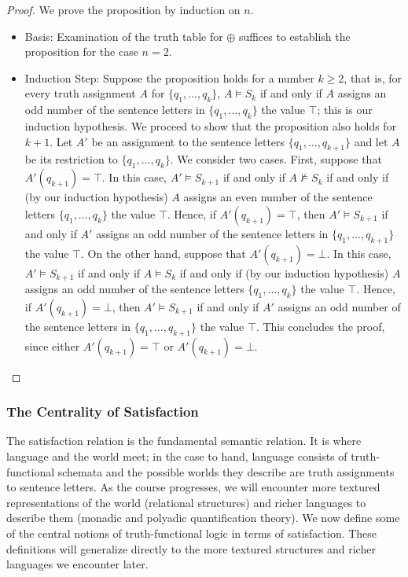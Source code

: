 \begin{proof}
    We prove the proposition by induction on $n$. 
    \begin{itemize}
        \item Basis: Examination of the truth table for $\oplus$ suffices to establish the proposition for the case $n=2$.

        \item Induction Step: Suppose the proposition holds for a number $k\geq 2$, that is, 
        for every truth assignment $A$ for $\{q_1,\ldots,q_k\}$, $A\models S_k$ if and only if $A$ assigns an odd number of the sentence letters in $\{q_1,\ldots,q_k\}$ the value $\top$; this is our induction hypothesis.
        We proceed to show that the proposition also holds for $k+1$. Let $A'$ be an assignment to the sentence letters 
        $\{q_1,\ldots,q_{k+1}\}$ and let $A$ be its restriction to $\{q_1,\ldots,q_k\}$. We consider two cases. First, suppose that $A'(q_{k+1}) = \top$. In this case, $A'\models S_{k+1}$ if and only if $A\not\models S_k$ if and only if (by our induction hypothesis) $A$ assigns an even number of the sentence letters $\{q_1,\ldots,q_k\}$ the value $\top$. Hence, if $A'(q_{k+1}) = \top$, then $A'\models S_{k+1}$ if and only if $A'$ assigns an odd number of the sentence letters in $\{q_1,\ldots,q_{k+1}\}$ the value $\top$. On the other hand, suppose that $A'(q_{k+1}) = \bot$. In this case, $A'\models S_{k+1}$ if and only if $A\models S_k$ if and only if (by our induction hypothesis) $A$ assigns an odd number of the sentence letters $\{q_1,\ldots,q_k\}$ the value $\top$. Hence, if $A'(q_{k+1}) = \bot$, then $A'\models S_{k+1}$ if and only if $A'$ assigns an odd number of the sentence letters in $\{q_1,\ldots,q_{k+1}\}$ the value $\top$. This concludes the proof, since either $A'(q_{k+1}) = \top$ or $A'(q_{k+1}) = \bot$. 
    \end{itemize}
\end{proof}

\subsubsection*{The Centrality of Satisfaction}

The satisfaction relation is the fundamental semantic relation. It is where language and the world meet; in the case to hand, language consists of truth-functional schemata and the possible worlds they describe are truth assignments to sentence letters. As the course progresses, we will encounter more textured representations of the world (relational structures) and richer languages to describe them (monadic and polyadic quantification theory). We now define some of the central notions of truth-functional logic in terms of satisfaction. These definitions will generalize directly to the more textured structures and richer languages we encounter later. 

